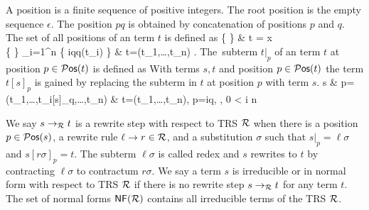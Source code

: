 \begin{definition}\label{def:position}
	A {\myem position} is a finite sequence of positive integers.
	The root position is the empty sequence $\epsilon$.
	The position $pq$ is obtained by concatenation of positions $p$ and $q$.
	The set of all positions of an term $t$ is defined as 
	{
		\{ \epsilon \} 		
		& t = x \in \mcV \\
%		
		\{ \epsilon \} \cup \bigcup_{i=1}^{n} \{ iq\mid q\in\pos(t_i) \}	
		& t=\mf(t_1,\ldots,t_n) \mf\in\mcFfn.
	}
The~{\myem subterm} $t|_p$ of an term $t$ {\myem at position} $p\in\operatorname{\mathcal{P}\mathsf{os}}(t)$ is defined as
%
%
With terms $s,t$ and position $p\in\operatorname{\mathcal{P}\mathsf{os}}(t)$ 
the term $t[s]_p$ is gained by replacing the subterm in $t$ at position $p$ with term $s$.
{
	s 		& p=\epsilon \\
	\mf(t_1,\ldots,t_i[s]_q,\ldots,t_n)	& t=\mf(t_1,\ldots,t_n), p=iq, \mf\in\mcFfn, 0 < i \leq n
}
\end{definition}
%
\begin{definition}
	We say $s\rightarrow_{\mathcal R} t$ is a 
	{\myem rewrite step} 
	 with respect to TRS ${\mathcal R}$ 
	when there is a position $p \in \operatorname{\mathcal{P}\mathsf{os}}(s)$, 
	a rewrite rule $\ell\rightarrow r\in{\mathcal R}$, 
	and a substitution $\sigma$ such that
	$s|_p=\ell\sigma$ and $s[r\sigma]_p = t$.
		The subterm $\ell\sigma$ is called {\myem redex} and
	$s$ rewrites to $t$ by {\myem contracting} $\ell\sigma$ to {\myem contractum} $r\sigma$.
	We say a term $s$ is {\myem irreducible} or in {\myem normal form} with respect to TRS ${\mathcal R}$ if there is no rewrite step $s\rightarrow_{\mathcal R} t$ for any term $t$. 
	The set of normal forms $\mathsf{NF}({\mathcal R})$ contains all irreducible terms of the TRS ${\mathcal R}$.
	\end{definition}
%
